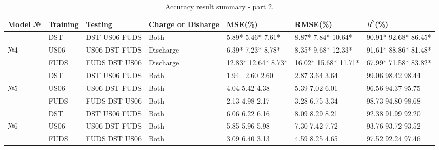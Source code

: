 \begin{center}
    \begin{table}[htbp]
    \caption{Accuracy result summary - part 2.}
    \label{tab:acc-results2}
\begin{tabular}{ p{1.5cm} p{1.5cm} p{1.5cm} p{3.2cm} p{1.5cm} p{1.5cm} p{1.8cm} }
    \hline
    Model № & Training  & Testing & Charge or Disharge & MSE(\%) & RMSE(\%) & $R^{2}$(\%) \\
    \hline
     & DST  & DST US06 FUDS & Both & 5.89* 5.46* 7.61* & 8.87* 7.84* 10.64* & 90.91* 92.68* 86.45* \\
    №4%
     & US06 & US06 DST FUDS & Discharge & 6.39* 7.23* 8.78* & 8.35* 9.68* 12.33* & 91.61* 88.86* 81.48* \\
     & FUDS & FUDS DST US06 & Discharge & 12.83* 12.64* 8.73* & 16.02* 15.68* 11.71* & 67.99* 71.58* 83.82* \\
    \hline
     & DST  & DST US06 FUDS & Both & 1.94 \ 2.60 2.60 & 2.87 3.64 3.64 & 99.06 98.42 98.44 \\
     №5%
     & US06 & US06 DST FUDS & Both & 4.04 5.42 4.38 & 5.39 7.02 6.01 & 96.56 94.37 95.75 \\
     & FUDS & FUDS DST US06 & Both & 2.13 4.98 2.17  & 3.28 6.75 3.34 & 98.73 94.80 98.68  \\    
    \hline%
     & DST  & DST US06 FUDS & Both & 6.06 6.22 6.16 & 8.09 8.29 8.21 & 92.38 91.99 92.20 \\
    №6%
     & US06 & US06 DST FUDS & Both & 5.85 5.96 5.98 & 7.30 7.42 7.72 & 93.76 93.72 93.52 \\
     & FUDS & FUDS DST US06 & Both & 3.09 6.40 3.13 & 4.59 8.25 4.65 & 97.52 92.24 97.46 \\
    \hline
\end{tabular}
    \end{table}
\end{center}
